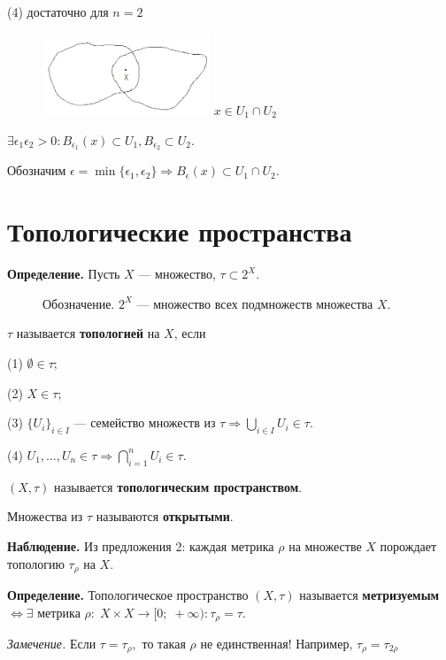 \documentclass[12pt,a4paper]{article}
\begin{document}
(4) достаточно для $n = 2$

\begin{figure}
	\includegraphics[width = 5cm]{lect2_3.png}
	$x \in U_1 \cap U_2$
\end{figure}

$\exists \epsilon_1 \epsilon_2 > 0: B_{\epsilon_1}(x) \subset U_1, B_{\epsilon_2} \subset U_2.$

Обозначим $\epsilon = \min\{\epsilon_1, \epsilon_2\} \Rightarrow B_{\epsilon}(x) \subset  U_1 \cap U_2.$

\section{Топологические пространства}

\textbf{Определение.} Пусть $X$ --- множество, $\tau \subset 2^{X}.$

\begin{figure}
	Обозначение. $2^{X}$ --- множество всех подмножеств множества $X.$
\end{figure}

$\tau$ называется \textbf{топологией} на $X$, если

(1) $\emptyset \in \tau;$

(2) $X \in \tau;$

(3) $\{U_i\}_{i \in I}$ --- семейство множеств из $\tau \Rightarrow \bigcup_{i \in I} U_i \in \tau.$

(4) $U_1, \ldots, U_n \in \tau \Rightarrow \bigcap^n_{i = 1} U_i \in \tau.$

$\left(X, \tau \right)$ называется \textbf{топологическим пространством}.

Множества из $\tau$ называются \textbf{открытыми}.

\textbf{Наблюдение.} Из предложения 2: каждая метрика $\rho$ на множестве $X$ порождает топологию $\tau_{\rho}$ на $X.$

\textbf{Определение.} Топологическое пространство $(X, \tau)$ называется \textbf{метризуемым} $\Leftrightarrow \exists$ метрика $\rho: \; X\times X \to [0;\; +\infty): \tau_{\rho} = \tau.$

\textit{Замечение.} Если $\tau = \tau_{\rho},$ то такая $\rho$ не единственная! Например, $\tau_{\rho} = \tau_{2\rho}$
\end{document}
